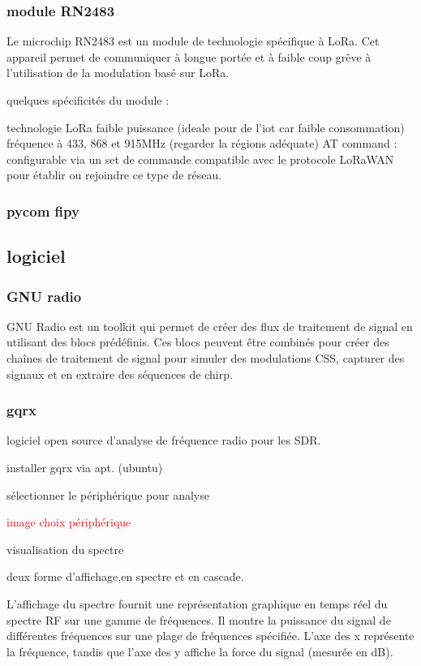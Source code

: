 \subsubsection{module RN2483}

Le microchip RN2483 est un module de technologie spécifique à LoRa. Cet appareil permet de communiquer à longue portée et à faible coup grêve à l'utilisation de la modulation basé sur LoRa.

quelques spécificités du module :

technologie LoRa
faible puissance (ideale pour de l'iot car faible consommation)
fréquence à 433, 868 et 915MHz (regarder la régions adéquate)
AT command : configurable via un set de commande
compatible avec le protocole LoRaWAN pour établir ou rejoindre ce type de réseau.

\subsubsection{pycom fipy}

\subsection{logiciel}

\subsubsection{GNU radio}

GNU Radio est un toolkit qui permet de créer des flux de traitement de signal en utilisant des blocs prédéfinis. Ces blocs peuvent être combinés pour créer des chaînes de traitement de signal pour simuler des modulations CSS, capturer des signaux et en extraire des séquences de chirp.

\subsubsection{gqrx}

logiciel open source d'analyse de fréquence radio pour les SDR.

installer gqrx via apt. (ubuntu)

sélectionner le périphérique pour analyse

\textcolor{red}{image choix périphérique}

visualisation du spectre

deux forme d'affichage,en spectre et en cascade.

L'affichage du spectre fournit une représentation graphique en temps réel du spectre RF sur une gamme de fréquences.
Il montre la puissance du signal de différentes fréquences sur une plage de fréquences spécifiée.
L'axe des x représente la fréquence, tandis que l'axe des y affiche la force du signal (mesurée en dB).

